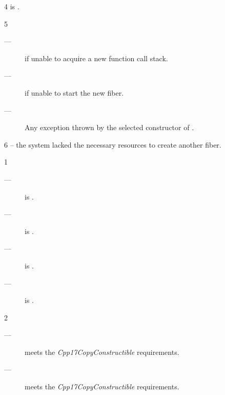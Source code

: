 4 \postcond
\emptyfn is \false.

5 \except
\begin{description}
    \item[---]  if unable to acquire a new function call stack.
    \item[---]  if unable to start the new fiber.
    \item[---] Any exception thrown by the selected constructor of .
\end{description}

6 \errors
{} -- the system lacked the necessary resources to create another fiber.


1 \mandates
\begin{description}
    \item[---]  is \true.
    \item[---]  is \true.
    \item[---]  is \true.
    \item[---]  is \true.
\end{description}

2 \constraints
\begin{description}
    \item[---]  meets the \emph{Cpp17CopyConstructible} requirements.
    \item[---]  meets the \emph{Cpp17CopyConstructible} requirements.
\end{description}

